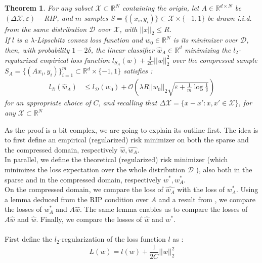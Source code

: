 \documentclass{article}
\newcommand{\R}{\mathbb R}
\newtheorem{theorem}{Theorem}[section]
\begin{document}
\begin{theorem}\label{th1}
    For any subset $\mathcal{X}\subset \R^N$ containing the origin, 
    let $A\in \R^{d\times N}$ be $(\Delta \mathcal{X}, \varepsilon)-$RIP, and $m$ 
    samples $S=\{ (x_i, y_i)\} \subset \mathcal{X}\times \{-1, 1\}$
    be drawn i.i.d. from the same distribution $\mathcal{D}$ over 
    $\mathcal{X}$, with $||x||_2 \leq R$. \\ 
    If $l$ is a $\lambda$-Lipschitz convex loss function and $w_0\in \R^N$
    is its minimizer over $\mathcal{D}$, then, with probability
    $1-2\delta$, the linear classifier $\hat{w}_A\in \R^d$ minimizing the 
    $l_2$-regularized empirical loss function $l_{S_A}(w)+\frac{1}{2C} ||w||_2^2$
    over the compressed sample $S_A = \{(Ax_i, y_i) \}_{i=1}^m
    \subset \R^d \times \{-1, 1\} $ satisfies :
    \begin{align}
        l_{\mathcal{D}}(\hat{w}_A) &\leq 
        l_{\mathcal{D}}(w_0) + \mathcal{O}
        \left ( 
            \lambda R ||w_0||_2 \sqrt{\varepsilon + \frac{1}{m}\log\frac{1}{\delta}}
        \right )
    \end{align}
    for an appropriate choice of $C$, and recalling that
     $\Delta \mathcal{X} = \{x-x' : x, x' \in \mathcal{X} \}$, for 
     any $\mathcal{X}\subset \R^N$
\end{theorem}


    As the proof is a bit complex, we are going to explain its outline first.
    The idea is to first define an empirical (regularized) risk minimizer on both 
    the sparse and the compressed domain, respectively $\hat{w}, \hat{w_A}$.\\ 
    In parallel, we define the theoretical (regularized) risk minimizer 
    (which minimizes the loss expectation over the 
    whole distribution $\mathcal{D}$ ), also both in the sparse 
    and in the compressed domain, respectively $w^*, w_A^*$. \\
    On the compressed domain, we compare the loss of $\hat{w_A}$ with 
    the loss of $w_A^*$. Using a lemma deduced from the RIP condition over $A$
    and a result from \cite{NIPS2008_3400}, we compare the 
    losses of $w_A^*$ and $A\hat{w}$. The same lemma enables us to 
    compare the losses of $A\hat{w}$ and $\hat{w}$. Finally, 
    we compare the losses of $\hat{w}$ and $w^*$. \\ \\

    First define the $l_2$-regularization of the loss function $l$ as :
    \[L(w) = l(w) + \frac{1}{2C}||w||_2^2\]
\end{document}
